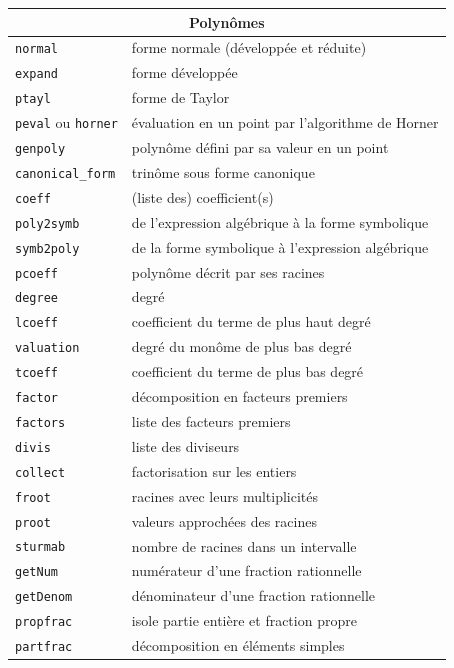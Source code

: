 \documentclass{article}
\begin{document}
\begin{center}
\begin{tabular}{|ll|}
\hline
\multicolumn{2}{|c|}{\bf Polyn\^omes}\\
\hline\hline
\verb|normal| &forme normale (d\'evelopp\'ee et r\'eduite)\\
\verb|expand| &forme d\'evelopp\'ee\\
\verb|ptayl| &forme de Taylor\\
\verb|peval| ou \verb|horner| &\'evaluation en un point par l'algorithme de Horner\\
\verb|genpoly| & polyn\^ome d\'efini par sa valeur en un point\\
\verb|canonical_form| & trin\^ome sous forme canonique\\
\hline
\verb|coeff| &(liste des) coefficient(s)\\
\verb|poly2symb| & de l'expression alg\'ebrique \`a la forme symbolique\\
\verb|symb2poly| & de la forme symbolique \`a l'expression alg\'ebrique\\
\verb|pcoeff| &polyn\^ome d\'ecrit par ses racines\\
\hline
\verb|degree| &degr\'e\\
\verb|lcoeff| &coefficient du terme de plus haut degr\'e\\
\verb|valuation| &degr\'e du mon\^ome de plus bas degr\'e\\
\verb|tcoeff| &coefficient du terme de plus bas degr\'e\\
\hline
\verb|factor| & d\'ecomposition en facteurs premiers\\
\verb|factors| & liste des facteurs premiers\\
\verb|divis| & liste des diviseurs\\
\verb|collect| & factorisation sur les entiers\\
\hline
\verb|froot| & racines avec leurs multiplicit\'es\\
\verb|proot| & valeurs approch\'ees des racines\\
\verb|sturmab| & nombre de racines dans un intervalle\\
\hline
\verb|getNum| & num\'erateur d'une fraction rationnelle\\
\verb|getDenom| & d\'enominateur d'une fraction rationnelle\\
\verb|propfrac| & isole partie enti\`ere et fraction propre\\
\verb|partfrac| & d\'ecomposition en \'el\'ements simples\\

\end{tabular}
\end{center}
\end{document}
